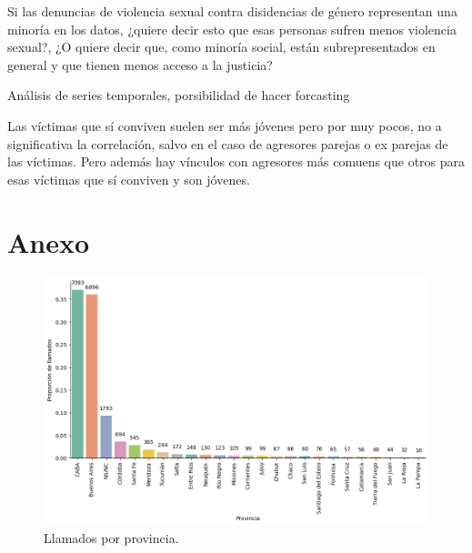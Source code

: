 \documentclass[10 pt]{article}
\begin{document}
Si las denuncias de violencia sexual contra disidencias de género representan una minoría en los datos, ¿quiere decir esto que esas personas sufren menos violencia sexual?, ¿O quiere decir que, como minoría social, están subrepresentados en general y que tienen menos acceso a la justicia?



Análisis de series temporales, porsibilidad de hacer forcasting

Las víctimas que sí conviven suelen ser más jóvenes pero por muy pocos, no a significativa la correlación, salvo en el caso de agresores parejas o ex parejas de las víctimas. Pero además hay vínculos con agresores más comuens que otros para esas víctimas que sí conviven y son jóvenes.
\newpage




\newpage
\section*{Anexo}\label{anex}




\begin{figure}[H]
\begin{center}
\includegraphics[scale=.5]{images/latex_llamados_por_provincia.png}
\caption{Llamados por provincia.}
\label{provincia}
\end{center}
\end{figure}
\end{document}
